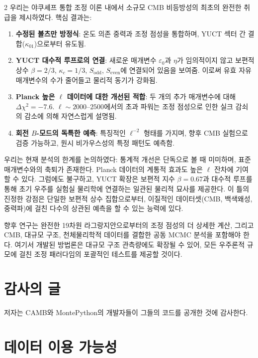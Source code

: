 \documentclass[11pt,a4paper]{article}
\begin{document}
\begin{multicols}{2}
		우리는 야쿠셰프 통합 조정 이론 내에서 소규모 CMB 비등방성의 최초의 완전한 취급을 제시하였다. 핵심 결과는:
		\begin{enumerate}
			\item \textbf{수정된 볼츠만 방정식}: 온도 의존 중력과 조정 점성을 통합하며, YUCT 섹터 간 결합($\kappa_{01}$)으로부터 유도됨.
			\item \textbf{YUCT 대수적 루프로의 연결}: 새로운 매개변수 $\varepsilon_0$과 $\eta$가 임의적이지 않고 보편적 상수 $\beta=2/3$, $\kappa_c=1/3$, $S_{\mathrm{odd}}$, $S_{\mathrm{even}}$에 연결되어 있음을 보여줌. 이로써 유효 자유 매개변수의 수가 줄어들고 물리적 동기가 강화됨.
			\item \textbf{Planck 높은 $\ell$ 데이터에 대한 개선된 적합}: 두 개의 추가 매개변수에 대해 $\Delta\chi^2 = -7.6$. $\ell \sim 2000$--$2500$에서의 초과 파워는 조정 점성으로 인한 실크 감쇠의 감소에 의해 자연스럽게 설명됨.
			\item \textbf{회전 $B$-모드의 독특한 예측}: 특징적인 $\ell^{-2}$ 형태를 가지며, 향후 CMB 실험으로 검증 가능하고, 원시 비가우스성의 특정 패턴도 예측함.
		\end{enumerate}
		
		우리는 현재 분석의 한계를 논의하였다: 통계적 개선은 단독으로 볼 때 미미하며, 표준 매개변수와의 축퇴가 존재한다. Planck 데이터의 계통적 효과도 높은 $\ell$ 잔차에 기여할 수 있다. 그럼에도 불구하고, YUCT 확장은 보편적 지수 $\beta = 0.67$과 대수적 루프를 통해 초기 우주를 실험실 물리학에 연결하는 일관된 물리적 묘사를 제공한다. 이 틀의 진정한 강점은 단일한 보편적 상수 집합으로부터, 이질적인 데이터셋(CMB, 백색왜성, 중력파)에 걸친 다수의 상관된 예측을 할 수 있는 능력에 있다.
		
		향후 연구는 완전한 19차원 라그랑지안으로부터의 조정 점성의 더 상세한 계산, 그리고 CMB, 대규모 구조, 천체물리학적 데이터를 결합한 공동 MCMC 분석을 포함해야 한다. 여기서 개발된 방법론은 대규모 구조 관측량에도 확장될 수 있어, 모든 우주론적 규모에 걸친 조정 패러다임의 포괄적인 테스트를 제공할 것이다.
		
		\section*{감사의 글}
		
		저자는 CAMB와 MontePython의 개발자들이 그들의 코드를 공개한 것에 감사한다.
		
		\section*{데이터 이용 가능성}
		

\end{multicols}
\end{document}
